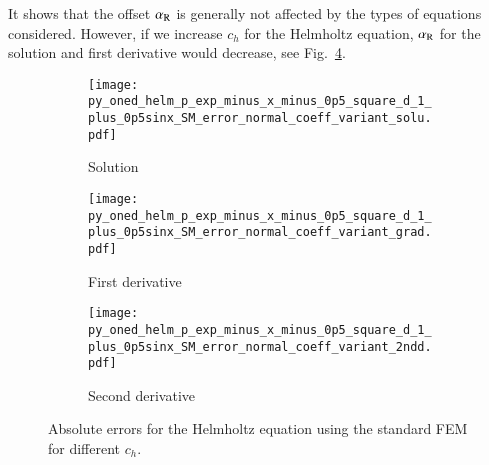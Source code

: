 \documentclass[review,3p]{elsarticle}
\begin{document}

It shows that the offset $\alpha_{\rm R}$ is generally not affected by the types of equations considered.
However, if we increase $c_h$ for the Helmholtz equation, $\alpha_{\rm R}$ for the solution and first derivative would decrease, see Fig.~\ref{py_oned_helm_p_exp_minus_x_minus_0p5_square_d_1_plus_0p5sinx_SM_error_normal_coeff_variant}.

\begin{figure}[!ht]
    \begin{subfigure}{5.5cm}
        \texttt{[image: py\_oned\_helm\_p\_exp\_minus\_x\_minus\_0p5\_square\_d\_1\_plus\_0p5sinx\_SM\_error\_normal\_coeff\_variant\_solu.pdf]}
        \caption{Solution}
        \label{py_oned_helm_p_exp_minus_x_minus_0p5_square_d_1_plus_0p5sinx_SM_error_normal_coeff_variant_solu}
    \end{subfigure}
    \hspace{-0.2cm}
    \begin{subfigure}{5.5cm}
        \texttt{[image: py\_oned\_helm\_p\_exp\_minus\_x\_minus\_0p5\_square\_d\_1\_plus\_0p5sinx\_SM\_error\_normal\_coeff\_variant\_grad.pdf]}
        \caption{First derivative}
        \label{py_oned_helm_p_exp_minus_x_minus_0p5_square_d_1_plus_0p5sinx_SM_error_normal_coeff_variant_grad}
    \end{subfigure}
    \hspace{-0.2cm}
    \begin{subfigure}{5.5cm}
        \texttt{[image: py\_oned\_helm\_p\_exp\_minus\_x\_minus\_0p5\_square\_d\_1\_plus\_0p5sinx\_SM\_error\_normal\_coeff\_variant\_2ndd.pdf]}
        \caption{Second derivative}
        \label{py_oned_helm_p_exp_minus_x_minus_0p5_square_d_1_plus_0p5sinx_SM_error_normal_coeff_variant_2ndd}
    \end{subfigure}
\caption{Absolute errors for the Helmholtz equation using the standard FEM for different $c_h$.}
\label{py_oned_helm_p_exp_minus_x_minus_0p5_square_d_1_plus_0p5sinx_SM_error_normal_coeff_variant}
\end{figure}

% 
%   
\end{document}
